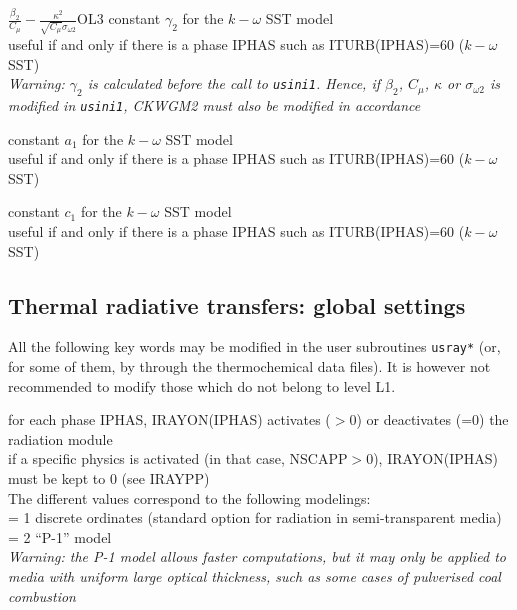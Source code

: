 {$\frac{\beta_2}{C_\mu}-\frac{\kappa^2}{\sqrt{C_\mu}\sigma_{\omega 2}}$}{O}{L3}
{constant $\gamma_2$ for the $k-\omega$ SST model\\
useful if and only if there is a phase IPHAS such as ITURB(IPHAS)=60
($k-\omega$ SST)\\
{\em Warning: $\gamma_2$ is calculated before the call to
\texttt{usini1}. Hence, if $\beta_2$, $C_\mu$, $\kappa$ or $\sigma_{\omega 2}$ 
is modified in \texttt{usini1}, CKWGM2 must also be modified in accordance}}

{constant $a_1$ for the $k-\omega$ SST model\\
useful if and only if there is a phase IPHAS such as ITURB(IPHAS)=60
($k-\omega$ SST)}

{constant $c_1$ for the $k-\omega$ SST model\\
useful if and only if there is a phase IPHAS such as ITURB(IPHAS)=60
($k-\omega$ SST)}


\subsection{Thermal radiative transfers: global settings}

All the following key words may be modified in the user subroutines
\texttt{usray*} (or, for some of them, by through the thermochemical data files).
It is however not recommended to modify those which do not belong to 
level L1.

{for each phase IPHAS, IRAYON(IPHAS) activates ($>0$) or deactivates
(=0) the radiation module\\ 
if a specific physics is activated (in that case, NSCAPP$>$0), 
IRAYON(IPHAS) must be kept to 0 (see IRAYPP)\\
The different values correspond to the following modelings:\\
\hspace*{1.3cm} = 1 discrete ordinates 
(standard option for radiation in semi-transparent media)\\
\hspace*{1.3cm} = 2  ``P-1'' model\\
{\em Warning: the P-1 model allows faster computations, but it 
may only be applied to media with uniform large optical thickness, such as
some cases of pulverised coal combustion}}

